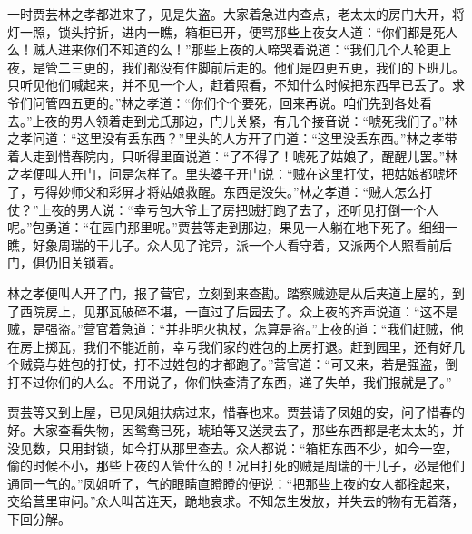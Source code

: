 \begin{parag}
    一时贾芸林之孝都进来了，见是失盗。大家着急进内查点，老太太的房门大开，将灯一照，锁头拧折，进内一瞧，箱柜已开，便骂那些上夜女人道：“你们都是死人么！贼人进来你们不知道的么！”那些上夜的人啼哭着说道：“我们几个人轮更上夜，是管二三更的，我们都没有住脚前后走的。他们是四更五更，我们的下班儿。只听见他们喊起来，并不见一个人，赶着照看，不知什么时候把东西早已丢了。求爷们问管四五更的。”林之孝道：“你们个个要死，回来再说。咱们先到各处看去。”上夜的男人领着走到尤氏那边，门儿关紧，有几个接音说：“唬死我们了。”林之孝问道：“这里没有丢东西？”里头的人方开了门道：“这里没丢东西。”林之孝带着人走到惜春院内，只听得里面说道：“了不得了！唬死了姑娘了，醒醒儿罢。”林之孝便叫人开门，问是怎样了。里头婆子开门说：“贼在这里打仗，把姑娘都唬坏了，亏得妙师父和彩屏才将姑娘救醒。东西是没失。”林之孝道：“贼人怎么打仗？”上夜的男人说：“幸亏包大爷上了房把贼打跑了去了，还听见打倒一个人呢。”包勇道：“在园门那里呢。”贾芸等走到那边，果见一人躺在地下死了。细细一瞧，好象周瑞的干儿子。众人见了诧异，派一个人看守着，又派两个人照看前后门，俱仍旧关锁着。
\end{parag}


\begin{parag}
    林之孝便叫人开了门，报了营官，立刻到来查勘。踏察贼迹是从后夹道上屋的，到了西院房上，见那瓦破碎不堪，一直过了后园去了。众上夜的齐声说道：“这不是贼，是强盗。”营官着急道：“并非明火执杖，怎算是盗。”上夜的道：“我们赶贼，他在房上掷瓦，我们不能近前，幸亏我们家的姓包的上房打退。赶到园里，还有好几个贼竟与姓包的打仗，打不过姓包的才都跑了。”营官道：“可又来，若是强盗，倒打不过你们的人么。不用说了，你们快查清了东西，递了失单，我们报就是了。”
\end{parag}


\begin{parag}
    贾芸等又到上屋，已见凤姐扶病过来，惜春也来。贾芸请了凤姐的安，问了惜春的好。大家查看失物，因鸳鸯已死，琥珀等又送灵去了，那些东西都是老太太的，并没见数，只用封锁，如今打从那里查去。众人都说：“箱柜东西不少，如今一空，偷的时候不小，那些上夜的人管什么的！况且打死的贼是周瑞的干儿子，必是他们通同一气的。”凤姐听了，气的眼睛直瞪瞪的便说：“把那些上夜的女人都拴起来，交给营里审问。”众人叫苦连天，跪地哀求。不知怎生发放，并失去的物有无着落，下回分解。
\end{parag}